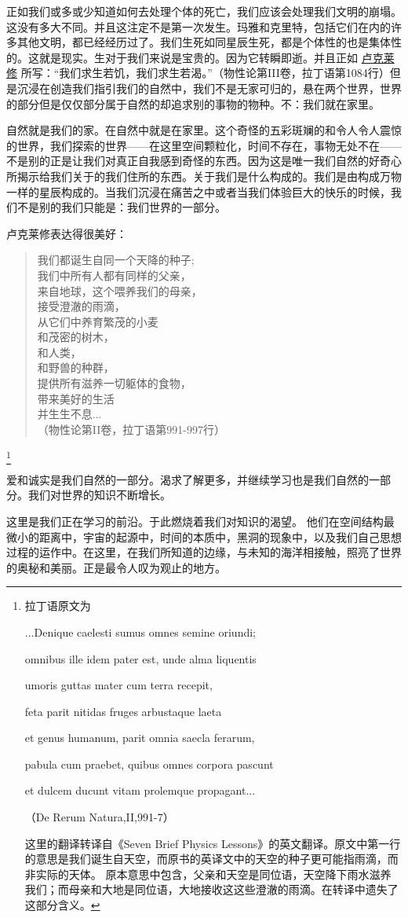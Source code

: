     正如我们或多或少知道如何去处理个体的死亡，我们应该会处理我们文明的崩塌。这没有多大不同。并且这注定不是第一次发生。玛雅和克里特，包括它们在内的许多其他文明，都已经经历过了。我们生死如同星辰生死，都是个体性的也是集体性的。这就是现实。生对于我们来说是宝贵的。因为它转瞬即逝。并且正如
\href{http://toyhouse.cc/wiki/index.php/卢克莱修}{卢克莱修}
所写：“我们求生若饥，我们求生若渴。”（物性论第III卷，拉丁语第1084行）但是沉浸在创造我们指引我们的自然中，我们不是无家可归的，悬在两个世界，世界的部分但是仅仅部分属于自然的却追求别的事物的物种。不：我们就在家里。

    自然就是我们的家。在自然中就是在家里。这个奇怪的五彩斑斓的和令人令人震惊的世界，我们探索的世界——在这里空间颗粒化，时间不存在，事物无处不在——不是别的正是让我们对真正自我感到奇怪的东西。因为这是唯一我们自然的好奇心所揭示给我们关于的我们住所的东西。关于我们是什么构成的。我们是由构成万物一样的星辰构成的。当我们沉浸在痛苦之中或者当我们体验巨大的快乐的时候，我们不是别的我们只能是：我们世界的一部分。
 
   卢克莱修表达得很美好：
\begin{verse} 

我们都诞生自同一个天降的种子;\\
我们中所有人都有同样的父亲，\\
来自地球，这个喂养我们的母亲，\\
接受澄澈的雨滴，\\
从它们中养育繁茂的小麦\\
和茂密的树木，\\
和人类，\\
和野兽的种群，\\
提供所有滋养一切躯体的食物，\\
带来美好的生活\\
并生生不息...\\
（物性论第II卷，拉丁语第991-997行）
 
\end{verse} 
\footnote[5]
{
拉丁语原文为

...Denique caelesti sumus omnes semine oriundi;

omnibus ille idem pater est, unde alma liquentis

umoris guttas mater cum terra recepit,

feta parit nitidas fruges arbustaque laeta

et genus humanum, parit omnia saecla ferarum,

pabula cum praebet, quibus omnes corpora pascunt

et dulcem ducunt vitam prolemque propagant...

（De Rerum Natura,II,991-7）

这里的翻译转译自《Seven Brief Physics Lessons》的英文翻译。原文中第一行的意思是我们诞生自天空，而原书的英译文中的天空的种子更可能指雨滴，而非实际的天体。
原本意思中包含，父亲和天空是同位语，天空降下雨水滋养我们；而母亲和大地是同位语，大地接收这这些澄澈的雨滴。在转译中遗失了这部分含义。
}

    爱和诚实是我们自然的一部分。渴求了解更多，并继续学习也是我们自然的一部分。我们对世界的知识不断增长。
 
   这里是我们正在学习的前沿。于此燃烧着我们对知识的渴望。 他们在空间结构最微小的距离中，宇宙的起源中，时间的本质中，黑洞的现象中，以及我们自己思想过程的运作中。在这里，在我们所知道的边缘，与未知的海洋相接触，照亮了世界的奥秘和美丽。正是最令人叹为观止的地方。




\noindent
